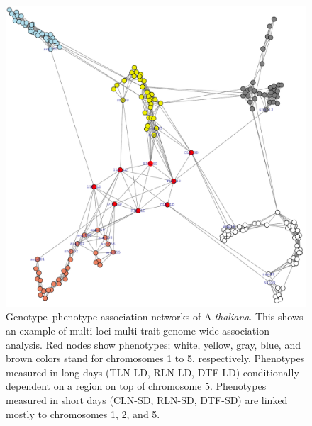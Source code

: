 \begin{figure}[!t]
	\centering
	\includegraphics[width=0.7 \textwidth]{Fig6.pdf}
	\caption{Genotype--phenotype association networks of A.\emph{thaliana}. This shows an example of multi-loci multi-trait genome-wide association analysis. Red nodes show phenotypes; white, yellow, gray, blue, and brown colors stand for chromosomes 1 to 5, respectively. Phenotypes measured in long days (TLN-LD, RLN-LD, DTF-LD) conditionally dependent on a region on top of chromosome 5. %
	Phenotypes measured in short days (CLN-SD, RLN-SD, DTF-SD) are linked mostly to chromosomes 1, 2, and 5. }
	\label{thaliana-phenoGeno}
\end{figure}

